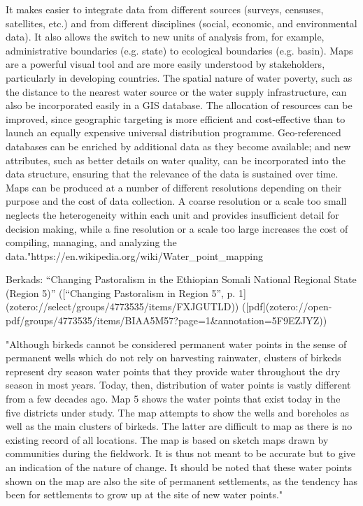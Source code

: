 It makes easier to integrate data from different sources (surveys, censuses, satellites, etc.) and from different disciplines (social, economic, and environmental data). It also allows the switch to new units of analysis from, for example, administrative boundaries (e.g. state) to ecological boundaries (e.g. basin).
Maps are a powerful visual tool and are more easily understood by stakeholders, particularly in developing countries.
The spatial nature of water poverty, such as the distance to the nearest water source or the water supply infrastructure, can also be incorporated easily in a GIS database.
The allocation of resources can be improved, since geographic targeting is more efficient and cost-effective than to launch an equally expensive universal distribution programme.
Geo-referenced databases can be enriched by additional data as they become available; and new attributes, such as better details on water quality, can be incorporated into the data structure, ensuring that the relevance of the data is sustained over time.
Maps can be produced at a number of different resolutions depending on their purpose and the cost of data collection. A coarse resolution or a scale too small neglects the heterogeneity within each unit and provides insufficient detail for decision making, while a fine resolution or a scale too large increases the cost of compiling, managing, and analyzing the data."https://en.wikipedia.org/wiki/Water_point_mapping


Berkads:
“Changing Pastoralism in the Ethiopian Somali National Regional State (Region 5)” ([“Changing Pastoralism in Region 5”, p. 1](zotero://select/groups/4773535/items/FXJGUTLD)) ([pdf](zotero://open-pdf/groups/4773535/items/BIAA5M57?page=1&annotation=5F9EZJYZ))

"Although birkeds cannot be considered permanent water points in the sense of permanent wells which do not rely on harvesting rainwater, clusters of birkeds represent dry season water points that they provide water throughout the dry season in most years. Today, then, distribution of water points is vastly different from a few decades ago. Map 5 shows the water points that exist today in the five districts under study. The map attempts to show the wells and boreholes as well as the main clusters of birkeds. The latter are difficult to map as there is no existing record of all locations. The map is based on sketch maps drawn by communities during the fieldwork. It is thus not meant to be accurate but to give an indication of the nature of change. It should be noted that these water points shown on the map are also the site of permanent settlements, as the tendency has been for settlements to grow up at the site of new water points."



